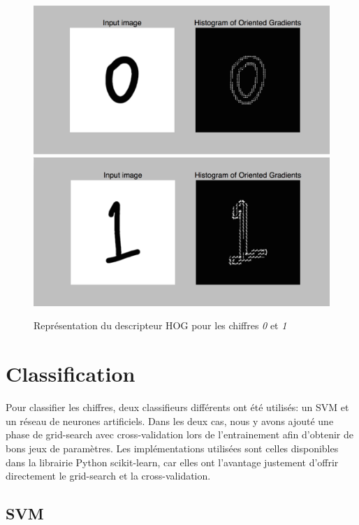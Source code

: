 \begin{figure}[!h]
\includegraphics[width=\textwidth]{pictures/hog0}
\includegraphics[width=\textwidth]{pictures/hog1}
\caption{Représentation du descripteur HOG pour les chiffres \emph{0} et \emph{1}}
\label{fig:hog}
\end{figure}

\section{Classification}

Pour classifier les chiffres, deux classifieurs différents ont été utilisés: un SVM et un réseau de neurones artificiels. Dans les deux cas, nous y avons ajouté une phase de grid-search avec cross-validation lors de l'entrainement afin d'obtenir de bons jeux de paramètres. Les implémentations utilisées sont celles disponibles dans la librairie Python scikit-learn, car elles ont l'avantage justement d'offrir directement le grid-search et la cross-validation.

\subsection{SVM}

